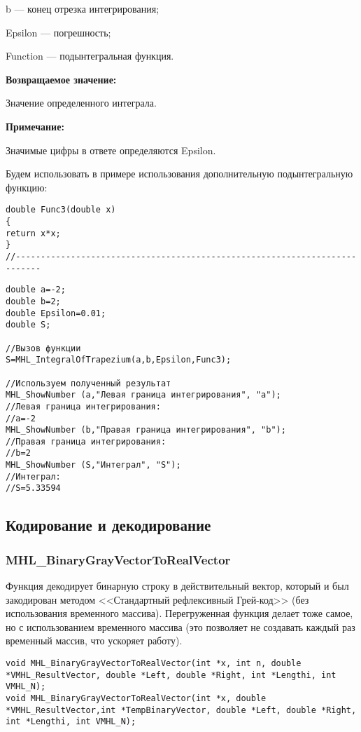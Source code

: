 \documentclass[a4paper,12pt]{article}
\begin{document}
 b --- конец отрезка интегрирования;
 
 Epsilon --- погрешность;
 
 Function --- подынтегральная функция.

\textbf{Возвращаемое значение:}
 
 Значение определенного интеграла.
 
 \textbf{Примечание:}
 
 Значимые цифры в ответе определяются Epsilon.

Будем использовать в примере использования дополнительную подынтегральную функцию:

\begin{lstlisting}[caption=Дополнительная функция]
double Func3(double x)
{
return x*x;
}
//---------------------------------------------------------------------------
\end{lstlisting}


\begin{lstlisting}[label=code_use_MHL_IntegralOfTrapezium,caption=Пример использования]
double a=-2;
double b=2;
double Epsilon=0.01;
double S;

//Вызов функции
S=MHL_IntegralOfTrapezium(a,b,Epsilon,Func3);

//Используем полученный результат
MHL_ShowNumber (a,"Левая граница интегрирования", "a");
//Левая граница интегрирования:
//a=-2
MHL_ShowNumber (b,"Правая граница интегрирования", "b");
//Правая граница интегрирования:
//b=2
MHL_ShowNumber (S,"Интеграл", "S");
//Интеграл:
//S=5.33594
\end{lstlisting}

\subsection{Кодирование и декодирование}

\subsubsection{MHL\_BinaryGrayVectorToRealVector}\label{MHL_BinaryGrayVectorToRealVector}

Функция декодирует бинарную строку в действительный вектор, который и был закодирован методом <<Стандартный рефлексивный Грей-код>> (без использования временного массива). Перегруженная функция делает тоже самое, но с использованием временного массива (это позволяет не создавать каждый раз временный массив, что ускоряет работу).


\begin{lstlisting}[label=code_syntax_MHL_BinaryGrayVectorToRealVector,caption=Синтаксис]
void MHL_BinaryGrayVectorToRealVector(int *x, int n, double *VMHL_ResultVector, double *Left, double *Right, int *Lengthi, int VMHL_N);
void MHL_BinaryGrayVectorToRealVector(int *x, double *VMHL_ResultVector,int *TempBinaryVector, double *Left, double *Right, int *Lengthi, int VMHL_N);
\end{lstlisting}
\end{document}
